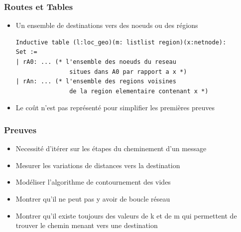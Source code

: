 \documentclass[handout]{beamer}
\begin{document}
\begin{frame}[fragile]
  \frametitle<1->{Routes et Tables}
    \begin{itemize}
    \item <1->{Un ensemble de destinations vers des noeuds ou des régions}
       \begin{lstlisting}
Inductive table (l:loc_geo)(m: listlist region)(x:netnode): 
Set :=
| rA0: ... (* l'ensemble des noeuds du reseau 
               situes dans A0 par rapport a x *)
| rAn: ... (* l'ensemble des regions voisines 
               de la region elementaire contenant x *)
    \end{lstlisting} 
    \item <2->{Le coût n'est pas représenté pour simplifier les premières preuves }
   \end{itemize}
\end{frame}

\begin{frame}
  \frametitle<1->{Preuves}
    \begin{itemize}
    \item <1->{Necessité d'itérer sur les étapes du cheminement d'un message}
    \item <2->{Mesurer les variations de distances vers la destination}
    \item <3->{Modéliser l'algorithme de contournement des vides}
    \item <4->{Montrer qu'il ne peut pas y avoir de boucle réseau}
    \item <5->{Montrer qu'il existe toujours des valeurs de k et de m qui 
    permettent de trouver le chemin menant vers une destination}
   \end{itemize}
\end{frame}
\end{document}
